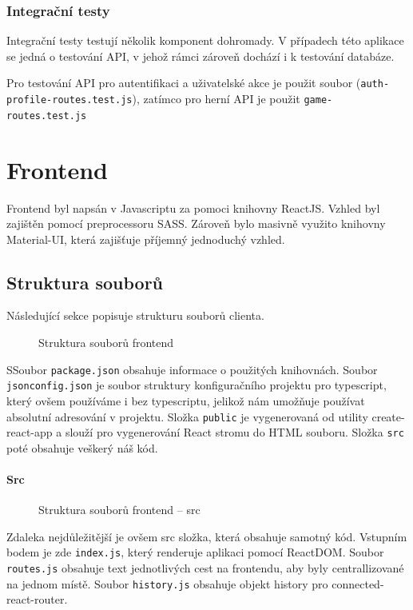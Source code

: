 \documentclass[a4paper,oneside,12pt]{report}
\begin{document}
\subsection{Integrační testy}
Integrační testy testují několik komponent dohromady. V případech této aplikace se jedná o testování API, v jehož rámci zároveň dochází i k testování databáze.

Pro testování API pro autentifikaci a uživatelské akce je použit soubor (\texttt{auth-profile-routes.test.js}), zatímco pro herní API je použit \texttt{game-routes.test.js}




\chapter{Frontend}

Frontend byl napsán v Javascriptu za pomoci knihovny ReactJS. Vzhled byl zajištěn pomocí preprocessoru SASS. Zároveň bylo masivně využito knihovny Material-UI, která zajišťuje příjemný jednoduchý vzhled.

\section{Struktura souborů}

Následující sekce popisuje strukturu souborů clienta.

\begin{figure}[H]
   \caption[Struktura souborů frontendu]{Struktura souborů frontend}
   \label{fig:frontendStructure}
\end{figure}

SSoubor \texttt{package.json} obsahuje informace o použitých knihovnách. Soubor \texttt{jsonconfig.json} je soubor struktury konfiguračního projektu pro typescript, který ovšem používáme i bez typescriptu, jelikož nám umožňuje používat absolutní adresování v projektu. Složka \texttt{public} je vygenerovaná od utility create-react-app a slouží pro vygenerování React stromu do HTML souboru. Složka \texttt{src} poté obsahuje veškerý náš kód.

\subsubsection{Src}
\begin{figure}[H]
   \caption[Struktura souborů frontendu -- src]{Struktura souborů frontend -- src}
   \label{fig:frontendStructureSrc}
\end{figure}
Zdaleka nejdůležitější je ovšem src složka, která obsahuje samotný kód.
Vstupním bodem je zde \texttt{index.js}, který renderuje aplikaci pomocí ReactDOM. Soubor \texttt{routes.js} obsahuje text jednotlivých cest na frontendu, aby byly centrallizované na jednom místě. Soubor \texttt{history.js} obsahuje objekt history pro connected-react-router. 
\end{document}
